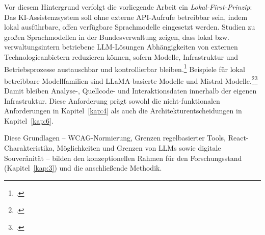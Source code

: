 Vor diesem Hintergrund verfolgt die vorliegende Arbeit ein \textit{Lokal-First-Prinzip}: Das \acs{KI}-Assistenzsystem soll ohne externe \ac{API}-Aufrufe betreibbar sein, indem lokal ausführbare, offen verfügbare Sprachmodelle eingesetzt werden. Studien zu großen Sprachmodellen in der Bundesverwaltung zeigen, dass lokal bzw. verwaltungsintern betriebene \ac{LLM}-Lösungen Abhängigkeiten von externen Technologieanbietern reduzieren können, sofern Modelle, Infrastruktur und Betriebsprozesse austauschbar und kontrollierbar bleiben.\footcite[Vgl.][S.~38--45]{wachsmannEtAlLLMBundesverwaltung2025} Beispiele für lokal betreibbare Modellfamilien sind LLaMA-basierte Modelle und Mistral-Modelle.\footcite[Vgl.][]{touvron2023llama2}\footcite[Vgl.][S.~1--2]{jiang2023mistral7b} Damit bleiben Analyse-, Quellcode- und Interaktionsdaten innerhalb der eigenen Infrastruktur. Diese Anforderung prägt sowohl die nicht-funktionalen Anforderungen in Kapitel~\ref{kap:4} als auch die Architekturentscheidungen in Kapitel~\ref{kap:6}.

Diese Grundlagen -- \ac{WCAG}-Normierung, Grenzen regelbasierter Tools, React-Charakteristika, Möglichkeiten und Grenzen von \ac{LLM}s sowie digitale Souveränität -- bilden den konzeptionellen Rahmen für den Forschungsstand (Kapitel~\ref{kap:3}) und die anschließende Methodik.